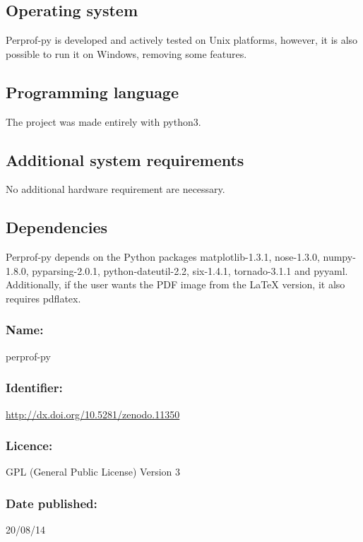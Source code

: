 \subsection*{Operating system}

    Perprof-py is developed and actively tested on Unix platforms, however, it
    is also possible to run it on Windows, removing some features.

\subsection*{Programming language}

    The project was made entirely with python3.

\subsection*{Additional system requirements}

    No additional hardware requirement are necessary.

\subsection*{Dependencies}

    Perprof-py depends on the Python packages matplotlib-1.3.1, nose-1.3.0,
    numpy-1.8.0, pyparsing-2.0.1, python-dateutil-2.2, six-1.4.1, tornado-3.1.1
    and pyyaml. Additionally, if the user wants the PDF image from the LaTeX
    version, it also requires pdflatex.

\Archive

    \subsubsection*{Name:} perprof-py

    \subsubsection*{Identifier:} \url{http://dx.doi.org/10.5281/zenodo.11350}

    \subsubsection*{Licence:} GPL (General Public License) Version 3

    \subsubsection*{Date published:} 20/08/14

